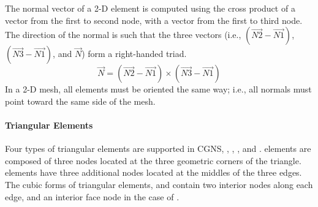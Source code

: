 {{{The normal vector of a 2-D element is computed using the cross product
of a vector from the first to second node, with a vector from the first
to third node.
The direction of the normal is such that the three
vectors (i.e., $(\overrightarrow{N2} - \overrightarrow{N1})$, 
$(\overrightarrow{N3} - \overrightarrow{N1})$, and $\overrightarrow{N}$)
form a right-handed triad.
$$
\overrightarrow{N} = (\overrightarrow{N2} - \overrightarrow{N1}) \times
                     (\overrightarrow{N3} - \overrightarrow{N1})
$$
In a 2-D mesh, all elements must be oriented the same way; i.e., all
normals must point toward the same side of the mesh.

\paragraph{Triangular Elements}
Four types of triangular elements are supported in CGNS, ,
, , and .
 elements are composed of three nodes located at the
three geometric corners of the triangle.
 elements have three additional nodes located at the
middles of the three edges.
The cubic forms of triangular elements,  and 
contain two interior nodes along each edge, and an interior face node
in the case of .


}}}
